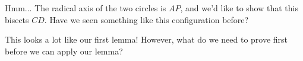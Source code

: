 



Hmm... The radical axis of the two circles is $AP$, and we'd like to show that this bisects $CD$. Have we seen something like this configuration before?




This looks a lot like our first lemma! However, what do we need to prove first before we can apply our lemma?












